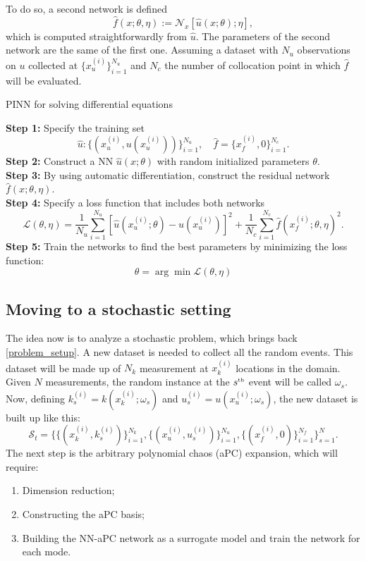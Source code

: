 \documentclass[11pt,a4paper]{article}
\begin{document}
To do so, a second network is defined 
\begin{equation}
    \hat{f}(x;\theta,\eta) := \mathcal{N}_x\left[ \hat{u}(x;\theta);\eta \right],
    \label{second_network}
\end{equation}
which is computed straightforwardly from \(\hat{u}\). The parameters of the second network are the same of the first one. 
Assuming a dataset with \(N_u\) observations on \(u\) collected at \(\{ x^{(i)}_u \}^{N_u}_{i=1}\) and \(N_c\) the number of collocation point in which \(\hat{f}\) will be evaluated.
\begin{algorithm}[H]
\caption{PINN for solving differential equations}\label{alg:cap}
\textbf{Step 1:} Specify the training set 
\[
    \hat{u}: \{ (x^{(i)}_u, u(x^{(i)}_u))\}^{N_u}_{i=1}, \quad \hat{f} = \{x^{(i)}_f, 0\}^{N_c}_{i=1}.
\]
\textbf{Step 2:} Construct a NN \(\hat{u}(x;\theta)\) with random initialized parameters \(\theta\). \\
\textbf{Step 3:} By using automatic differentiation, construct the residual network \(\hat{f}(x;\theta, \eta)\). \\
\textbf{Step 4:} Specify a loss function that includes both networks 
\begin{equation}
    \label{loss_fn}
    \mathcal{L}(\theta, \eta) = \frac{1}{N_u} \sum_{i=1}^{N_u} [\hat{u}(x^{(i)}_u; \theta) - u(x^{(i)}_u)]^2+ \frac{1}{N_c} \sum_{i=1}^{N_c}\hat{f}(x_f^{(i)};\theta, \eta)^2.
\end{equation}
\textbf{Step 5:} Train the networks to find the best parameters by minimizing the loss function:
\[
    \theta = \arg \min \mathcal{L}(\theta,\eta)
\]
\end{algorithm}
\subsection{Moving to a stochastic setting}
The idea now is to analyze a stochastic problem, which brings back \eqref{problem_setup}. A new dataset is needed to collect all the random events. This dataset will be made up of \(N_k\) measurement at \(x^{(i)}_k\) locations in the domain. Given \(N\) measurements, the random instance at the \(s^{\text{\tiny th}}\) event will be called \(\omega_s\). Now, defining \(k_s^{(i)} = k(x_k^{(i)}; \omega_s)\) and \(u_s^{(i)} = u(x_u^{(i)};\omega_s)\), the new dataset is built up like this:
\[
    \mathcal{S}_t = \{\{(x^{(i)}_k, k^{(i)}_s)\}^{N_k}_{i=1},\{(x^{(i)}_u, u^{(i)}_s)\}^{N_u}_{i=1},\{(x^{(i)}_f,0)\}^{N_f}_{i=1}\}^{N}_{s=1}.
\]    
The next step is the arbitrary polynomial chaos (aPC) expansion, which will require:
\begin{enumerate}
    \item Dimension reduction;
    \item Constructing the aPC basis;
    \item Building the NN-aPC network as a surrogate model and train the network for each mode.
\end{enumerate}
\end{document}

